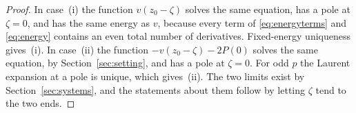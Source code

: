 \begin{proof}
In case~(i) the function \(v(z_0-\zeta)\) solves the same equation, has
a pole at \(\zeta=0\), and has the same energy as \(v\), because every
term of \eqref{eq:energyterms} and \eqref{eq:energy} contains an even
total number of derivatives. Fixed-energy uniqueness gives~(i). In
case~(ii) the function \(-v(z_0-\zeta)-2P(0)\) solves the same equation,
by Section~\ref{sec:setting}, and has a pole at \(\zeta=0\). For odd
\(p\) the Laurent expansion at a pole is unique, which gives~(ii). The
two limits exist by Section~\ref{sec:systems}, and the statements about
them follow by letting \(\zeta\) tend to the two ends.
\end{proof}
